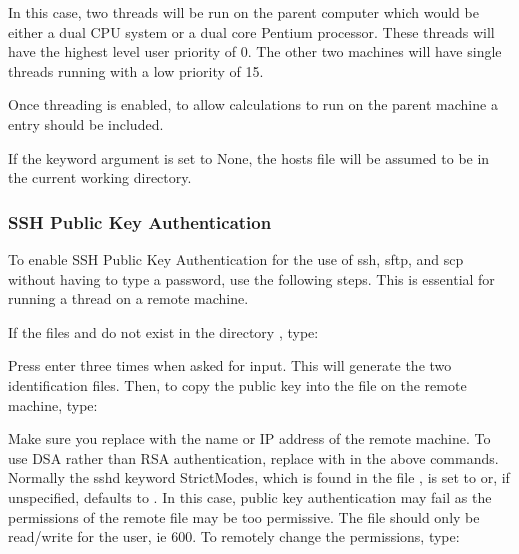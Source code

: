 In this case, two threads will be run on the parent computer which would be either a dual CPU system or a dual core  Pentium processor.  These threads will have the highest level user priority of 0.  The other two machines will have single threads running with a low priority of 15.


Once threading is enabled, to allow calculations to run on the parent machine a  entry should be included.


If the keyword argument  is set to None, the hosts file will be assumed to be in the current working directory.



\subsubsection{SSH Public Key Authentication}

To enable SSH Public Key Authentication for the use of ssh, sftp, and scp without having to type a password, use the following steps.  This is essential for running a thread on a remote machine.


If the files  and  do not exist in the directory , type:



Press enter three times when asked for input.  This will generate the two identification files.  Then, to copy the public key into the  file on the remote machine, type:



Make sure you replace  with the name or IP address of the remote machine.  To use DSA rather than RSA authentication, replace  with  in the above commands. Normally the sshd keyword StrictModes, which is found in the file , is set to  or, if unspecified, defaults to .  In this case, public key authentication may fail as the permissions of the remote file  may be too permissive.  The file should only be read/write for the user, ie 600.  To remotely change the permissions, type:



